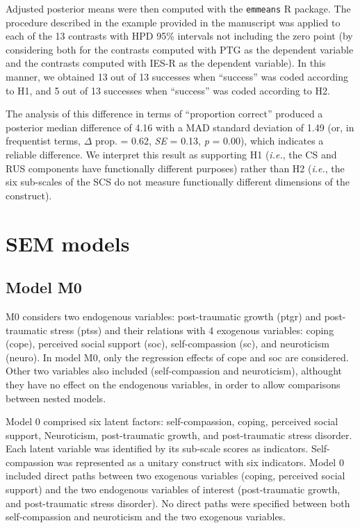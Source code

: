\begin{appendix}
Adjusted posterior means were then computed with the \texttt{emmeans} R
package. The procedure described in the example provided in the
manuscript was applied to each of the 13 contrasts with HPD 95\%
intervals not including the zero point (by considering both for the
contrasts computed with PTG as the dependent variable and the contrasts
computed with IES-R as the dependent variable). In this manner, we
obtained 13 out of 13 successes when ``success'' was coded according to
H1, and 5 out of 13 successes when ``success'' was coded according to
H2.

The analysis of this difference in terms of ``proportion correct''
produced a posterior median difference of 4.16 with a MAD standard
deviation of 1.49 (or, in frequentist terms, \(\Delta\) prop. = 0.62,
\emph{SE} = 0.13, \emph{p} = 0.00), which indicates a reliable
difference. We interpret this result as supporting H1 (\emph{i.e.}, the
CS and RUS components have functionally different purposes) rather than
H2 (\emph{i.e.}, the six sub-scales of the SCS do not measure
functionally different dimensions of the construct).

\newpage

\hypertarget{sem-models}{%
\section{SEM models}\label{sem-models}}

\hypertarget{model-m0}{%
\subsection{Model M0}\label{model-m0}}

M0 considers two endogenous variables: post-traumatic growth (ptgr) and
post-traumatic stress (ptss) and their relations with 4 exogenous
variables: coping (cope), perceived social support (soc),
self-compassion (sc), and neuroticism (neuro). In model M0, only the
regression effects of cope and soc are considered. Other two variables
also included (self-compassion and neuroticism), althought they have no
effect on the endogenous variables, in order to allow comparisons
between nested models.

Model 0 comprised six latent factors: self-compassion, coping, perceived
social support, Neuroticism, post-traumatic growth, and post-traumatic
stress disorder. Each latent variable was identified by its sub-scale
scores as indicators. Self-compassion was represented as a unitary
construct with six indicators. Model 0 included direct paths between two
exogenous variables (coping, perceived social support) and the two
endogenous variables of interest (post-traumatic growth, and
post-traumatic stress disorder). No direct paths were specified between
both self-compassion and neuroticism and the two exogenous variables.


\end{appendix}
